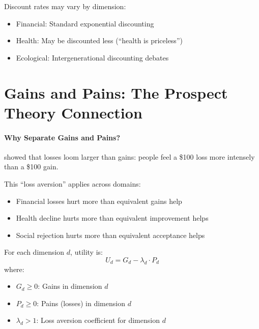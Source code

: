 \begin{intuition}
Discount rates may vary by dimension:
\begin{itemize}[nosep]
  \item Financial: Standard exponential discounting
  \item Health: May be discounted less (``health is priceless'')
  \item Ecological: Intergenerational discounting debates
\end{itemize}
\end{intuition}



\section{Gains and Pains: The Prospect Theory Connection}
\label{sec:fepsde-valence}


\paragraph{Why Separate Gains and Pains?}
\citet{kahnemantversky1979} showed that losses loom larger than gains:
people feel a \$100 loss more intensely than a \$100 gain.

This ``loss aversion'' applies across domains:
\begin{itemize}[nosep]
  \item Financial losses hurt more than equivalent gains help
  \item Health decline hurts more than equivalent improvement helps
  \item Social rejection hurts more than equivalent acceptance helps
\end{itemize}

\begin{definition}
For each dimension $d$, utility is:
\begin{equation}
  U_d = G_d - \lambda_d \cdot P_d
  \label{eq:loss-aversion}
\end{equation}
where:
\begin{itemize}[nosep]
  \item $G_d \geq 0$: Gains in dimension $d$
  \item $P_d \geq 0$: Pains (losses) in dimension $d$
  \item $\lambda_d > 1$: Loss aversion coefficient for dimension $d$
\end{itemize}
\end{definition}

